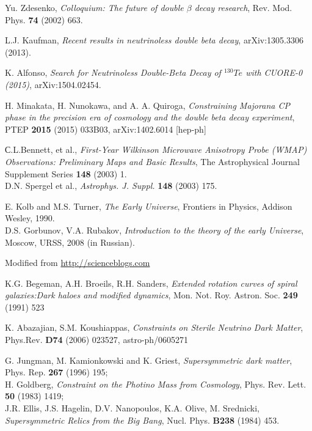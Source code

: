 \documentclass{cernyrep}
\begin{document}
\begin{thebibliography}{100}

Yu. Zdesenko, {\it Colloquium: The future of double $\beta$ decay research},  Rev. Mod. Phys.  {\bf 74} (2002) 663.

L.J. Kaufman, {\it Recent results in neutrinoless double beta decay}, arXiv:1305.3306 (2013).

K. Alfonso, {\it Search for Neutrinoless Double-Beta Decay of $^{130}Te$ with CUORE-0 (2015)},  arXiv:1504.02454.


H. Minakata, H. Nunokawa, and A. A. Quiroga, {\it Constraining Majorana CP phase in the precision era of cosmology and the double beta decay experiment}, PTEP {\bf 2015} (2015) 033B03, arXiv:1402.6014 [hep-ph]


С.L.Bennett,  et al., {\it First-Year Wilkinson Microwave Anisotropy Probe (WMAP) Observations: Preliminary Maps and Basic Results},  The Astrophysical Journal Supplement Series {\bf 148} (2003) 1.\\
D.N. Spergel et al.,
{\em Astrophys. J. Suppl.} \textbf{148} (2003) 175.

E. Kolb and M.S. Turner,
{\em The Early Universe}, Frontiers in Physics, Addison Wesley, 1990.\\
D.S. Gorbunov, V.A. Rubakov,
{\em Introduction to the theory of the early Universe},
Moscow, URSS, 2008 (in Russian).

Modified from \url{http://scienceblogs.com}

K.G. Begeman, A.H. Broeils, R.H. Sanders, {\it Extended rotation curves of spiral galaxies:Dark haloes and modified dynamics},  Mon. Not. Roy. Astron. Soc. {\bf 249} (1991) 523 

K. Abazajian, S.M. Koushiappas, {\it Constraints on Sterile Neutrino Dark Matter},
Phys.Rev. {\bf D74} (2006) 023527, astro-ph/0605271

G. Jungman, M. Kamionkowski and K. Griest,
{\em Supersymmetric dark matter}, Phys. Rep. {\bf 267} (1996) 195;\\
H. Goldberg, {\em Constraint on the Photino Mass from Cosmology}, Phys. Rev. Lett. {\bf  50} (1983) 1419;\\
J.R. Ellis, J.S. Hagelin, D.V. Nanopoulos, K.A. Olive, M. Srednicki,
{\em Supersymmetric Relics from the Big Bang}, Nucl. Phys. {\bf  B238} (1984) 453.


\end{thebibliography}
\end{document}
